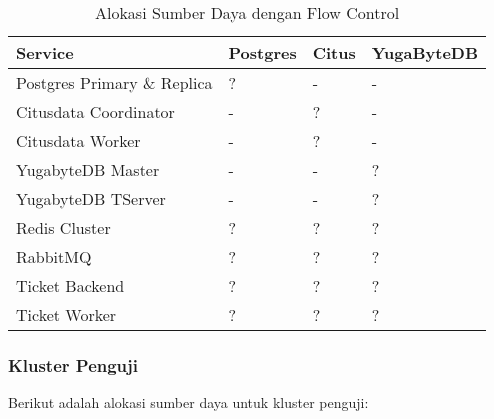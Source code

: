 \begin{table}[htbp]
    \centering
    \caption{Alokasi Sumber Daya dengan Flow Control}
    \label{tab:service_comparison_fc}
    \begin{tabular}{|l|l|l|l|}
        \hline
        \textbf{Service}            & \textbf{Postgres} & \textbf{Citus} & \textbf{YugaByteDB} \\ \hline
        Postgres Primary \& Replica & ?                 & -              & -                   \\ \hline
        Citusdata Coordinator       & -                 & ?              & -                   \\ \hline
        Citusdata Worker            & -                 & ?              & -                   \\ \hline
        YugabyteDB Master           & -                 & -              & ?                   \\ \hline
        YugabyteDB TServer          & -                 & -              & ?                   \\ \hline
        Redis Cluster               & ?                 & ?              & ?                   \\ \hline
        RabbitMQ                    & ?                 & ?              & ?                   \\ \hline
        Ticket Backend              & ?                 & ?              & ?                   \\ \hline
        Ticket Worker               & ?                 & ?              & ?                   \\ \hline
    \end{tabular}
\end{table}

\subsubsection{Kluster Penguji}

Berikut adalah alokasi sumber daya untuk kluster penguji:

